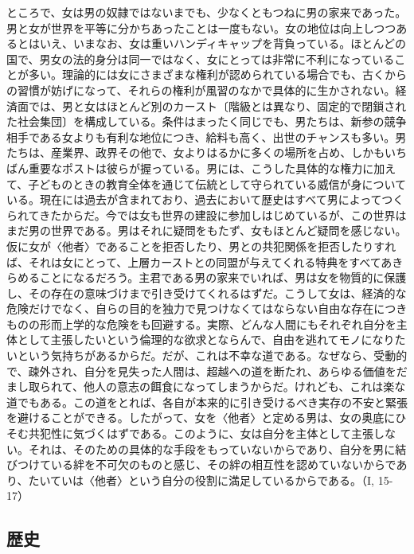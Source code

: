 ところで、女は男の奴隷ではないまでも、少なくともつねに男の家来であった。男と女が世界を平等に分かちあったことは一度もない。女の地位は向上しつつあるとはいえ、いまなお、女は重いハンディキャップを背負っている。ほとんどの国で、男女の法的身分は同一ではなく、女にとっては非常に不利になっていることが多い。理論的には女にさまざまな権利が認められている場合でも、古くからの習慣が妨げになって、それらの権利が風習のなかで具体的に生かされない。経済面では、男と女はほとんど別のカースト〔階級とは異なり、固定的で閉鎖された社会集団〕を構成している。条件はまったく同じでも、男たちは、新参の競争相手である女よりも有利な地位につき、給料も高く、出世のチャンスも多い。男たちは、産業界、政界その他で、女よりはるかに多くの場所を占め、しかもいちばん重要なポストは彼らが握っている。男には、こうした具体的な権力に加えて、子どものときの教育全体を通じて伝統として守られている威信が身についている。現在には過去が含まれており、過去において歴史はすべて男によってつくられてきたからだ。今では女も世界の建設に参加しはじめているが、この世界はまだ男の世界である。男はそれに疑問をもたず、女もほとんど疑問を感じない。仮に女が〈他者〉であることを拒否したり、男との共犯関係を拒否したりすれば、それは女にとって、上層カーストとの同盟が与えてくれる特典をすべてあきらめることになるだろう。主君である男の家来でいれば、男は女を物質的に保護し、その存在の意味づけまで引き受けてくれるはずだ。こうして女は、経済的な危険だけでなく、自らの目的を独力で見つけなくてはならない自由な存在につきものの形而上学的な危険をも回避する。実際、どんな人間にもそれぞれ自分を主体として主張したいという倫理的な欲求とならんで、自由を逃れてモノになりたいという気持ちがあるからだ。だが、これは不幸な道である。なぜなら、受動的で、疎外され、自分を見失った人間は、超越への道を断たれ、あらゆる価値をだまし取られて、他人の意志の餌食になってしまうからだ。けれども、これは楽な道でもある。この道をとれば、各自が本来的に引き受けるべき実存の不安と緊張を避けることができる。したがって、女を〈他者〉と定める男は、女の奥底にひそむ共犯性に気づくはずである。このように、女は自分を主体として主張しない。それは、そのための具体的な手段をもっていないからであり、自分を男に結びつけている絆を不可欠のものと感じ、その絆の相互性を認めていないからであり、たいていは〈他者〉という自分の役割に満足しているからである。（I, 15-17）



\subsection{歴史}


